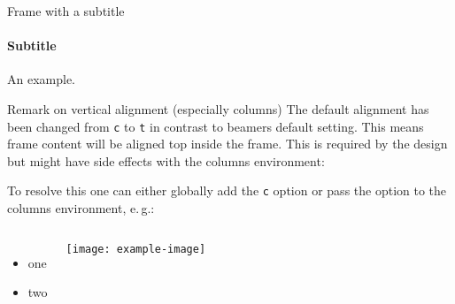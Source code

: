 \documentclass[
	english, %
	design=2023, %
	authorontitle=true,
	]{tudabeamer}
\newcommand*{\code}[1]{\texttt{#1}}
\begin{document}
\begin{frame}{Frame with a subtitle}
\framesubtitle{Subtitle}
An example.
\end{frame}

\begin{frame}{Remark on vertical alignment (especially columns)}
	The default alignment has been changed from \code{c} to \code{t} in contrast to beamers default setting.
	This means frame content will be aligned top inside the frame. 
	This is required by the design but might have side effects with the columns environment:
	
	To resolve this one can either globally add the \code{c} option or pass the option to the columns environment, e.\,g.:

\begin{columns}[onlytextwidth,c]
	\begin{itemize}
		\item one
		\item two
	\end{itemize}
	\texttt{[image: example-image]}
\end{columns}
\end{frame}
\end{document}
